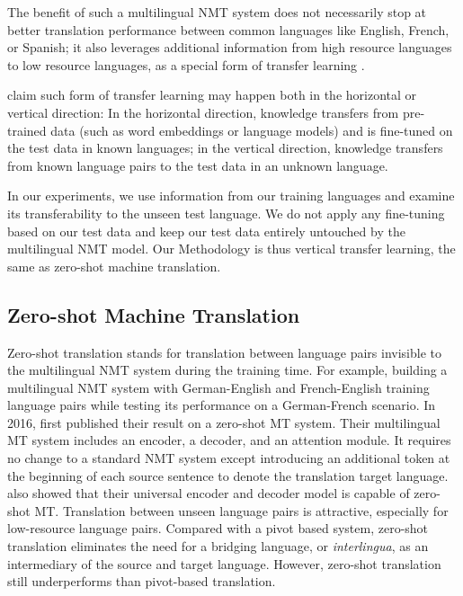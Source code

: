 \documentclass[thesis,fonts=libertine]{cluu}
\begin{document}
The benefit of such a multilingual NMT system does not necessarily stop at better translation performance between common languages like English, French, or Spanish; it also leverages additional information from high resource languages to low resource languages, as a special form of transfer learning \parencite{Zoph:2016aa}.

\textcite{Lakew:2019aa} claim such form of transfer learning may happen both in the horizontal or vertical direction: In the horizontal direction, knowledge transfers from pre-trained data (such as word embeddings or language models) and is fine-tuned on the test data in known languages; in the vertical direction, knowledge transfers from known language pairs to the test data in an unknown language.

In our experiments, we use information from our training languages and examine its transferability to the unseen test language. We do not apply any fine-tuning based on our test data and keep our test data entirely untouched by the multilingual NMT model. Our Methodology is thus vertical transfer learning, the same as zero-shot machine translation.

\subsection{Zero-shot Machine Translation}
\label{sec:zero_shot_mt}

Zero-shot translation stands for translation between language pairs invisible to the multilingual NMT system during the training time. For example, building a multilingual NMT system with German-English and French-English training language pairs while testing its performance on a German-French scenario. In 2016, \textcite{Johnson:2016aa} first published their result on a zero-shot MT system. Their multilingual MT system includes an encoder, a decoder, and an attention module. It requires no change to a standard NMT system except introducing an additional token at the beginning of each source sentence to denote the translation target language. \textcite{Ha:2016aa} also showed that their universal encoder and decoder model is capable of zero-shot MT. Translation between unseen language pairs is attractive, especially for low-resource language pairs. Compared with a pivot based system, zero-shot translation eliminates the need for a bridging language, or \textit{interlingua}, as an intermediary of the source and target language. However, zero-shot translation still underperforms than pivot-based translation.
\end{document}
